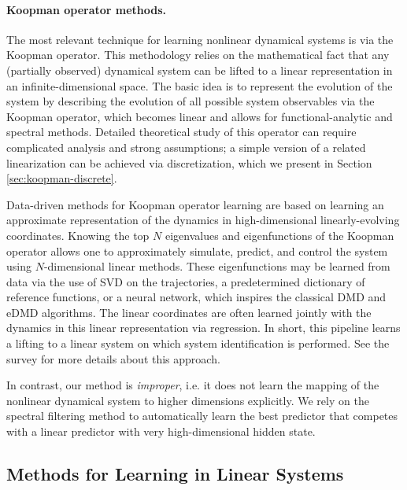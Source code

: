 \documentclass[11pt]{article}
\numberwithin{equation}{section}
\begin{document}
\paragraph{Koopman operator methods.}

The most relevant technique for learning nonlinear dynamical systems is via the Koopman operator. This methodology relies on the mathematical fact that any (partially observed) dynamical system can be lifted to a linear representation in an infinite-dimensional space. 
The basic idea is to represent the evolution of the system by describing the evolution of all possible system observables via the Koopman operator, which becomes linear and allows for functional-analytic and spectral methods. Detailed theoretical study of this operator can require complicated analysis and strong assumptions; a simple version of a related linearization can be achieved via discretization, which we present in Section \ref{sec:koopman-discrete}. 

Data-driven methods for Koopman operator learning are based on learning an approximate representation of the dynamics in high-dimensional linearly-evolving coordinates. Knowing the top $N$ eigenvalues and eigenfunctions of the Koopman operator allows one to approximately simulate, predict, and control the system using $N$-dimensional linear methods. These eigenfunctions may be learned from data via the use of SVD on the trajectories, a predetermined dictionary of reference functions, or a neural network, which inspires the classical DMD and eDMD algorithms. The linear coordinates are often learned jointly with the dynamics in this linear representation via regression. In short, this pipeline learns a lifting to a linear system on which system identification is performed.
See the survey \cite{brunton2021modernkoopmantheorydynamical} for more details about this approach. 


In contrast, our method is {\it improper}, i.e. it does not learn the mapping of the nonlinear dynamical system to higher dimensions explicitly. We rely on the spectral filtering method to automatically learn the best predictor that competes with a linear predictor with very high-dimensional hidden state. 



\subsection{Methods for Learning in Linear Systems}
\end{document}
